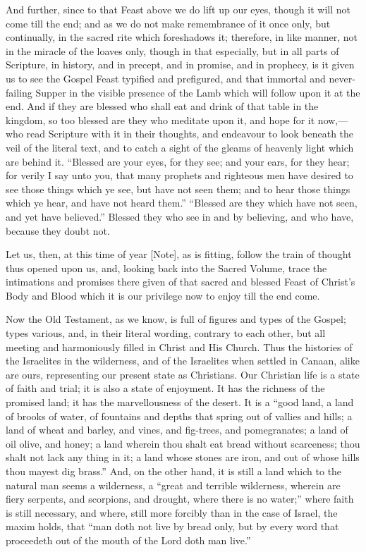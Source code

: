 And further, since to that Feast above we do lift up our eyes,
though it will not come till the end; and as we do not make
remembrance of it once only, but continually, in the sacred rite which
foreshadows it; therefore, in like manner, not in the miracle of the
loaves only, though in that especially, but in all parts of Scripture,
in history, and in precept, and in promise, and in prophecy, is it
given us to see the Gospel Feast typified and prefigured, and that
immortal and never-failing Supper in the visible presence of the Lamb
which will follow upon it at the end. And if they are blessed who
shall eat and drink of that table in the kingdom, so too blessed are
they who meditate upon it, and hope for it now,—who read Scripture
with it in their thoughts, and endeavour to look beneath the veil of
the literal text, and to catch a sight of the gleams of heavenly light
which are behind it. ``Blessed are your eyes, for they see; and
your ears, for they hear; for verily I say unto you, that many
prophets and righteous men have desired to see those things which ye
see, but have not seen them; and to hear those things which ye hear,
and have not heard them.'' ``Blessed are they which have not
seen, and yet have believed.'' Blessed they who see in and by
believing, and who have, because they doubt not.

Let us, then, at this time of year [Note],
as is fitting, follow the train of thought thus opened upon us, and,
looking back into the Sacred Volume, trace the intimations and
promises there given of that sacred and blessed Feast of Christ's Body
and Blood which it is our privilege now to enjoy till the end come.

Now the Old Testament, as we know, is full of figures and types of
the Gospel; types various, and, in their literal wording, contrary to
each other, but all meeting and harmoniously filled in Christ and His
Church. Thus the histories of the Israelites in the wilderness, and of
the Israelites when settled in Canaan, alike are ours, representing
our present state as Christians. Our Christian life is a state of
faith and trial; it is also a state of enjoyment. It has the richness
of the promised land; it has the marvellousness of the desert. It is a
``good land, a land of brooks of water, of fountains and depths
that spring out of vallies and hills; a land of wheat and barley, and
vines, and fig-trees, and pomegranates; a land of oil olive, and
honey; a land wherein thou shalt eat bread without scarceness; thou
shalt not lack any thing in it; a land whose stones are iron, and out
of whose hills thou mayest dig brass.'' And, on the other hand, it
is still a land which to the natural man seems a wilderness, a
``great and terrible wilderness, wherein are fiery serpents, and
scorpions, and drought, where there is no water;'' where faith is
still necessary, and where, still more forcibly than in the case of
Israel, the maxim holds, that ``man doth not live by bread only,
but by every word that proceedeth out of the mouth of the Lord doth
man live.''

